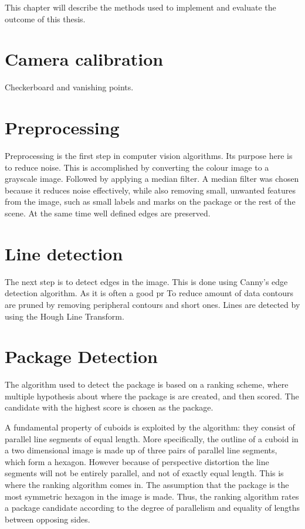 This chapter will describe the methods used to implement and evaluate the outcome of this thesis. %

\section{Camera calibration}
Checkerboard and vanishing points. %

\section{Preprocessing}

Preprocessing is the first step in computer vision algorithms. 
Its purpose here is to reduce noise. 
This is accomplished by converting the colour image to a grayscale image. 
Followed by applying a median filter. 
A median filter was chosen because it reduces noise effectively, while also removing small, unwanted features from the image, such as small labels and marks on the package or the rest of the scene. 
At the same time well defined edges are preserved.
\section{Line detection} %
The next step is to detect edges in the image. This is done using Canny's edge detection algorithm. As it is often a good pr
To reduce amount of data contours are pruned by removing peripheral contours and short ones.
Lines are detected by using the Hough Line Transform.

\section{Package Detection}

The algorithm used to detect the package is based on a ranking scheme, where multiple hypothesis about where the package is are created, and then scored. 
The candidate with the highest score is chosen as the package. 

A fundamental property of cuboids is exploited by the algorithm: they consist of parallel line segments of equal length. 
More specifically, the outline of a cuboid in a two dimensional image is made up of three pairs of parallel line segments, which form a hexagon. 
However because of perspective distortion the line segments will not be entirely parallel, and not  of exactly equal length.
This is where the ranking algorithm comes in.
The assumption that the package is the most symmetric hexagon in the image is made. %
Thus, the ranking algorithm rates a package candidate according to the degree of parallelism and equality of lengths between opposing sides.

